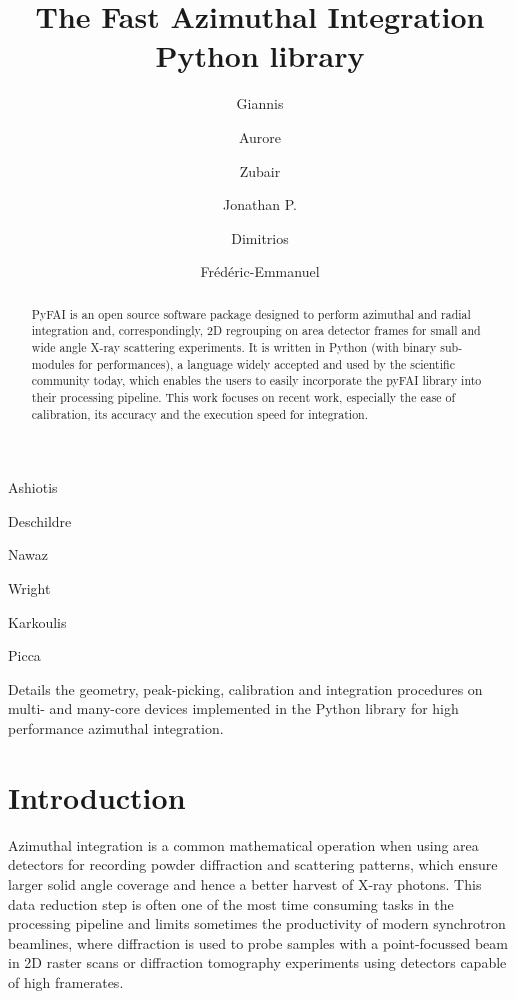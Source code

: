\documentclass{iucr}
\begin{document}
\title{The Fast Azimuthal Integration Python library}

    \author[a]{Giannis}{Ashiotis}
    \author[a]{Aurore}{Deschildre}
    \author[b]{Zubair}{Nawaz}
    \author[a]{Jonathan P.}{Wright}
    \author[a]{Dimitrios}{Karkoulis}
    \author[c]{Fr\'ed\'eric-Emmanuel}{Picca}


\maketitle

\begin{synopsis}
Details the geometry, peak-picking, calibration and integration procedures
on multi- and many-core devices implemented in the Python library for high
performance azimuthal integration.
\end{synopsis}

\begin{abstract}
PyFAI is an open source software package designed to perform azimuthal and
radial integration and, correspondingly, 2D regrouping on area detector frames for small and wide
angle X-ray scattering experiments.
It is written in Python (with binary sub-modules for performances), a
language widely accepted and used by the scientific community today, which enables
the users to easily incorporate the pyFAI library into their processing pipeline.
This work focuses on recent work, especially the ease of
calibration, its accuracy and the execution speed for integration.
\end{abstract}

\section{Introduction}

Azimuthal integration is a common mathematical operation when using area
detectors for recording powder diffraction and scattering patterns, which
ensure larger solid angle coverage and hence a better harvest of X­-ray photons.
This data reduction step is often one of the most time ­consuming tasks in the
processing pipeline and limits sometimes the productivity of modern synchrotron
beamlines, where diffraction is used to probe samples with a point-focussed
beam in 2D raster scans or diffraction tomography experiments using
detectors capable of high framerates.
\end{document}
